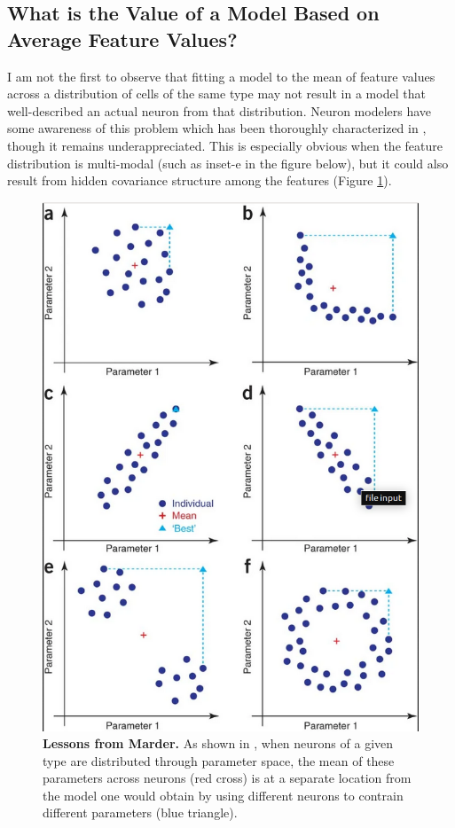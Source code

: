 \subsection{What is the Value of a Model Based on Average Feature Values?}
\label{sec:mean-model}
I am not the first to observe that fitting a model to the mean of feature values across a distribution of cells of the same type may not result in a model that well-described an actual neuron from that distribution.
Neuron modelers have some awareness of this problem which has been thoroughly characterized in \cite{marder2011multiple}, though it remains underappreciated.
This is especially obvious when the feature distribution is multi-modal (such as inset-e in the figure below), but it could also result from hidden covariance structure among the features (Figure \ref{fig:eve_marder}).

\begin{figure}
\begin{center}
\includegraphics[scale=0.65]{figures/eve_marder.png}
\end{center}
\caption[Considerations from Marder]{\textbf{Lessons from Marder.} As shown in \cite{marder2011multiple}, when neurons of a given type are distributed through parameter space, the mean of these parameters across neurons (red cross) is at a separate location from the model one would obtain by using different neurons to contrain different parameters (blue triangle).}
\label{fig:eve_marder}
\end{figure}

